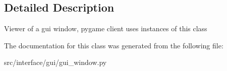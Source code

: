 \subsection{\-Detailed \-Description}
\begin{DoxyVerb}Viewer of a gui window, pygame client uses instances of this class \end{DoxyVerb}
 

\-The documentation for this class was generated from the following file\-:\begin{DoxyCompactItemize}
\item 
src/interface/gui/gui\-\_\-window.\-py\end{DoxyCompactItemize}
